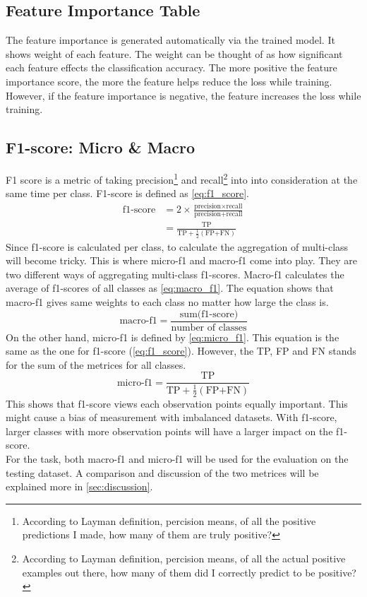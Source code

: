 \documentclass[10pt, a4paper, twocolumn]{article} %
\begin{document}
\subsection{Feature Importance Table}
The feature importance is generated automatically via the trained model. It shows weight of each feature. The weight can 
be thought of as how significant each feature effects the classification accuracy. The more positive the feature importance 
score, the more the feature helps reduce the loss while training. However, if the feature importance is negative, the feature 
increases the loss while training.
\subsection{F1-score: Micro \& Macro}
F1 score is a metric of taking precision\footnote{According to Layman definition, percision means, 
of all the positive predictions I made, how many of them are truly positive?} and 
recall\footnote{According to Layman definition, percision means, of all the actual positive examples 
out there, how many of them did I correctly predict to be positive?} into into consideration at the 
same time per class. F1-score is defined as \autoref{eq:f1_score}.\\[10pt]
\begin{equation}\label{eq:f1_score}
	\begin{split}
		\text{f1-score} &= 2\times \frac{\text{precision} \times \text{recall}}{\text{precision} + \text{recall}}\\
		&= \frac{\text{TP}}{\text{TP}+\frac{1}{2}(\text{FP+FN})}
	\end{split}
\end{equation}
Since f1-score is calculated per class, to calculate the aggregation of multi-class will become tricky. 
This is where micro-f1 and macro-f1 come into play. They are two different ways of aggregating multi-class 
f1-scores. Macro-f1 calculates the average of f1-scores of all classes as \autoref{eq:macro_f1}. The equation 
shows that macro-f1 gives same weights to each class no matter how large the class is. 
\begin{equation}\label{eq:macro_f1}
	\text{macro-f1} = \frac{\text{sum(f1-score)}}{\text{number of classes}}
\end{equation}
On the other hand, micro-f1 is defined by \autoref{eq:micro_f1}. This equation is the same as the one for 
f1-score (\autoref{eq:f1_score}). However, the TP, FP and FN stands for the sum of the metrices for all classes.  
\begin{equation}\label{eq:micro_f1}
	\text{micro-f1} = \frac{\text{TP}}{\text{TP}+\frac{1}{2}(\text{FP+FN})}
\end{equation}
This shows that f1-score views each observation points equally important. This might cause a bias of measurement 
with imbalanced datasets. With f1-score, larger classes with more observation points will have a larger impact on 
the f1-score.\\[10pt]
For the task, both macro-f1 and micro-f1 will be used for the evaluation on the testing dataset. A comparison and 
discussion of the two metrices will be explained more in \autoref{sec:discussion}.
\end{document}
